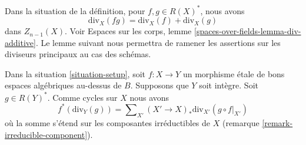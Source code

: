 \noindent
Dans la situation de la définition, pour $f, g \in R(X)^*$, nous avons
$$
\text{div}_X(fg) = \text{div}_X(f) + \text{div}_X(g)
$$
dans $Z_{n - 1}(X)$. Voir Espaces sur les corps, lemme
\ref{spaces-over-fields-lemma-div-additive}. Le lemme suivant nous permettra
de ramener les assertions sur les diviseurs principaux au cas des schémas.

\begin{lemma}
\label{lemma-etale-pullback-principal-divisor}
Dans la situation \ref{situation-setup}, soit $f : X \to Y$ un morphisme
\'etale de bons espaces algébriques au-dessus de $B$. Supposons que $Y$ soit intègre.
Soit $g \in R(Y)^*$. Comme cycles sur $X$ nous avons
$$
f^*(\text{div}_Y(g)) =
\sum\nolimits_{X'} (X' \to X)_*\text{div}_{X'}(g \circ f|_{X'})
$$
où la somme s'étend sur les composantes irréductibles de $X$ (remarque
\ref{remark-irreducible-component}).
\end{lemma}

